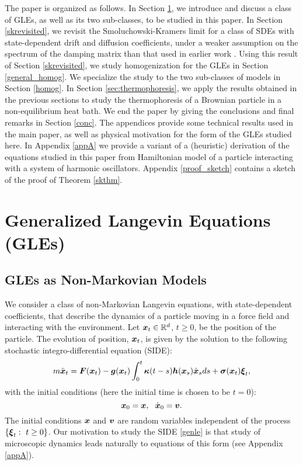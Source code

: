The paper is organized as follows. In Section \ref{nmle}, we introduce and discuss a class of GLEs, as well as its two sub-classes, to be studied in this paper.  In Section \ref{skrevisited}, we revisit the Smoluchowski-Kramers limit for a class of SDEs with state-dependent drift and diffusion coefficients, under a weaker assumption on the spectrum of the damping matrix than that used in earlier work \cite{hottovy2015smoluchowski}.  Using this result of Section \ref{skrevisited}, we study homogenization for the GLEs in Section \ref{general_homog}. We specialize the study to the two sub-classes of models in Section \ref{homog}.  In Section \ref{sec:thermophoresis}, we apply the results obtained in the previous sections to study the thermophoresis of a Brownian particle in a non-equilibrium heat bath. We end the paper by giving the conclusions and final remarks in Section \ref{conc}. The appendices provide some technical results used in the main paper, as well as physical motivation for the form of the GLEs studied here. In Appendix \ref{appA} we provide a variant of a (heuristic) derivation of the equations studied in this paper from Hamiltonian model of a particle interacting with a system of harmonic oscillators.  Appendix \ref{proof_sketch} contains a sketch of the proof of Theorem \ref{skthm}.

\section{Generalized Langevin Equations (GLEs)} \label{nmle}
\subsection{GLEs as Non-Markovian Models} \label{nmleA}

We consider a class of non-Markovian Langevin equations, with state-dependent coefficients, that describe the dynamics of a particle moving in a force field and interacting with the environment. Let $\boldsymbol{x}_{t} \in \mathbb{R}^{d}$, $t \geq 0$, be the position of the particle. The evolution of position,  $\boldsymbol{x}_{t}$, is given by the solution to the following stochastic integro-differential equation (SIDE):
\begin{equation} \label{genle}
 m \ddot{\boldsymbol{x}}_{t} =  \boldsymbol{F}(\boldsymbol{x}_{t}) - \boldsymbol{g}(\boldsymbol{x}_{t}) \int_{0}^{t} \boldsymbol{\kappa}(t-s) \boldsymbol{h}(\boldsymbol{x}_{s}) \dot{\boldsymbol{x}}_{s} ds +  \boldsymbol{\sigma}(\boldsymbol{x}_{t}) \boldsymbol{\xi}_{t}, 
\end{equation}
with the initial conditions (here the initial time is chosen to be  $t=0$): 
\begin{equation}
\vecc{x}_{0} = \vecc{x}, \ \ \dot{\vecc{x}}_{0} = \vecc{v}.
\end{equation}
The initial conditions $\boldsymbol{x}$ and $\boldsymbol{v}$ are random variables independent of  the process $\{\boldsymbol{\xi}_{t}: \ t \geq 0\}$.  Our motivation to study the SIDE \eqref{genle} is that study of microscopic dynamics leads naturally to  equations of this form (see Appendix \ref{appA}).  

